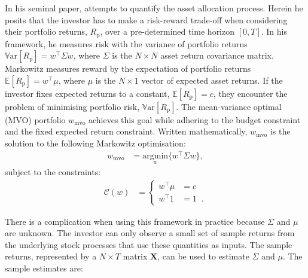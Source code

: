 \documentclass[
]{article}
\begin{document}
In his seminal paper, \citet{M52} attempts to quantify the asset allocation process. Herein he posits that
the investor has to make a risk-reward trade-off when considering their portfolio returns,
\(R_\mathrm{p}\), over a pre-determined time horizon \([0, T]\). In his framework, he measures risk with
the variance of portfolio returns \(\mathbb{V}\mathrm{ar}[R_\mathrm{p}] = w^\intercal \Sigma w\),
where \(\Sigma\) is the \(N \times N\) asset return covariance matrix. Markowitz measures reward by the
expectation of portfolio returns \(\mathbb{E}[R_\mathrm{p}] = w^\intercal \mu\), where \(\mu\) is the
\(N \times 1\) vector of expected asset returns. If the investor fixes expected returns to a constant,
\(\mathbb{E}[R_\mathrm{p}] = c\), they encounter the problem of minimising portfolio risk,
\(\mathbb{V}\mathrm{ar}[R_\mathrm{p}]\). The mean-variance optimal (MVO) portfolio \(w_\mathrm{mvo}\)
achieves this goal while adhering to the budget constraint and the fixed expected return constraint.
Written mathematically, \(w_\mathrm{mvo}\) is the solution to the following Markowitz optimisation:
\begin{align} 
w_\mathrm{mvo} &= \underset{w}{\text{argmin}} \Big \{ w^\intercal \Sigma w \Big \},
\label{eq:mvoone}
\end{align}
subject to the constraints:
\begin{align*}
\mathcal{C}(w) &= 
\begin{cases}
 w^\intercal \mu &= c \;\;\;  \\
w^\intercal \underline{1} &= 1 \;\; .
\end{cases}
\end{align*}

There is a complication when using this framework in practice because \(\Sigma\) and \(\mu\) are
unknown. The investor can only observe a small set of sample returns from the underlying stock
processes that use these quantities as inputs. The sample returns, represented by a \(N \times T\)
matrix \(\textbf{X}\), can be used to estimate \(\Sigma\) and \(\mu\). The sample estimates are:
\end{document}
